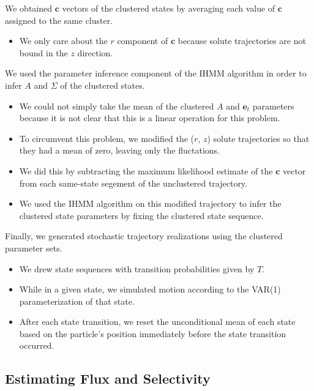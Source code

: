 \documentclass{article}
\begin{document}
  We obtained $\mathbf{c}$ vectors of the clustered states by averaging 
  each value of $\mathbf{c}$ assigned to the same cluster.
  \begin{itemize}
   \item We only care about the $r$ component of $\mathbf{c}$ because solute
   trajectories are not bound in the $z$ direction.
  \end{itemize}

  We used the parameter inference component of the IHMM algorithm in order to 
  infer $A$ and $\Sigma$ of the clustered states.
  \begin{itemize}
   \item We could not simply take the mean of the clustered 
   $A$ and $\mathbf{e}_t$ parameters because it is not clear that this is a linear 
   operation for this problem. 
   \item To circumvent this problem, we modified the ($r$, $z$) solute
   trajectories so that they had a mean of zero, leaving only the 
   fluctations. 
   \item We did this by subtracting the maximum likelihood estimate
   of the $\mathbf{c}$ vector from each same-state segement of the unclustered
   trajectory.   
   \item We used the IHMM algorithm on this modified trajectory to infer
   the clustered state parameters by fixing the clustered state sequence. 
  \end{itemize}
  
  Finally, we generated stochastic trajectory realizations using the clustered
  parameter sets.
  \begin{itemize}
    \item We drew state sequences with transition probabilities given by $T$.
    \item While in a given state, we simulated motion according to the VAR(1)
    parameterization of that state.
    \item After each state transition, we reset the unconditional mean of each 
    state based on the particle's position immediately before the state transition
    occurred.
  \end{itemize} 
  
  \subsection{Estimating Flux and Selectivity}
  
\end{document}
